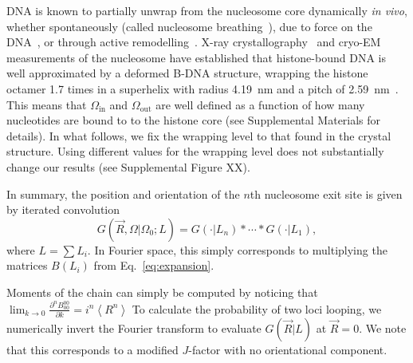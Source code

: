 \documentclass[%
 reprint,
superscriptaddress,
showpacs,preprintnumbers,
 amsmath,amssymb,
 aps,
 prl,
]{revtex4-1}
\newcommand{\greens}[2][\Omega_0; L]{G(#2|#1)}
\begin{document}
DNA is known to partially unwrap from the nucleosome core dynamically \textit{in
    vivo}, whether spontaneously (called nucleosome breathing~\cite{TODO}), due to
    force on the DNA~\cite{TODO}, or through active
    remodelling~\cite{dion2007,kulaeva2007,senavirathne2017}.
X-ray crystallography~\cite{white2001,richmond2003,cutter2015a} and
    cryo-EM~\cite{bednar2017,bilokapic2018,eltsov2018,wakamori2015,zhou2015}
    measurements of the nucleosome have established that histone-bound DNA is
    well approximated by a deformed B-DNA structure, wrapping the histone
    octamer 1.7 times in a superhelix with radius \SI{4.19}{\nano\metre} and a
    pitch of \SI{2.59}{\nano\metre}~\cite{richmond2003}.
This means that $\Omega_\text{in}$ and $\Omega_\text{out}$ are well defined as a
    function of how many nucleotides are bound to to the histone core (see
    Supplemental Materials for details).
In what follows, we fix the wrapping level to that found in the crystal
    structure.
Using different values for the wrapping level does not substantially change our
    results (see Supplemental Figure XX).

In summary, the position and orientation of the $n$th nucleosome exit site
    is given by iterated convolution
\begin{equation}\label{eq:conv}
    \greens{\vec{R},\Omega} = \greens[L_n]{\cdot} * \cdots{} * \greens[L_1]{\cdot},
\end{equation}
    where $L = \sum L_i$.
In Fourier space, this simply corresponds to multiplying the matrices $B(L_i)$
    from Eq.~\ref{eq:expansion}.

Moments of the chain can simply be computed by noticing that
    $\lim_{k\to0} \frac{\partial^n B_{00}^{00}}{\partial k} = i^n \left\langle
    R^n\right\rangle$
To calculate the probability of two loci looping, we numerically invert
    the Fourier transform to evaluate $\greens[L]{\vec{R}}$ at $\vec{R} = 0$.
We note that this corresponds to a modified $J$-factor with no orientational
    component.
\end{document}
